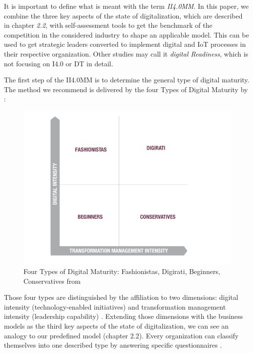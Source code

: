 It is important to define what is meant with the term \emph{\ac{II4.0MM}}. In this paper, we combine the three key aspects of the state of digitalization, which are described in chapter \emph{2.2},
with self-assessment tools to get the benchmark of the competition in the considered industry to shape an applicable model. This can be used to get strategic leaders converted to implement digital and \ac{IoT} processes in their respective organization.
Other studies may call it \emph{digital Readiness}, which is not focusing on \ac{I4.0} or \ac{DT} in detail.

The first step of the \ac{II4.0MM} is to determine the general type of digital maturity. The method we recommend is delivered by the four Types of Digital Maturity by \citeauthor[p.4]{CapgeminiMaturityModelDigitalAdvantage}:

\begin{figure}[H]
\centering
\includegraphics[width=1\columnwidth]{images/maturityModel_4segments_capgemini.PNG}
\caption{Four Types of Digital Maturity: Fashionistas, Digirati, Beginners, Conservatives from \citeauthor{CapgeminiMaturityModelDigitalAdvantage} \cite[p.4]{CapgeminiMaturityModelDigitalAdvantage}}
\label{fig:FourTypesMaturityCapgemini}
\end{figure}

Those four types are distinguished by the affiliation to two dimensions: digital intensity (technology-enabled initiatives) and transformation management intensity (leadership capability) \cite{CapgeminiMaturityModelDigitalAdvantage}. Extending those dimensions with the business models as the third key aspects of the state of digitalization, we can see an analogy to our predefined model (chapter 2.2). Every organization can classify themselves into one described type by answering specific questionnaires \cite{CapgeminiMaturityModelDigitalAdvantage}.

